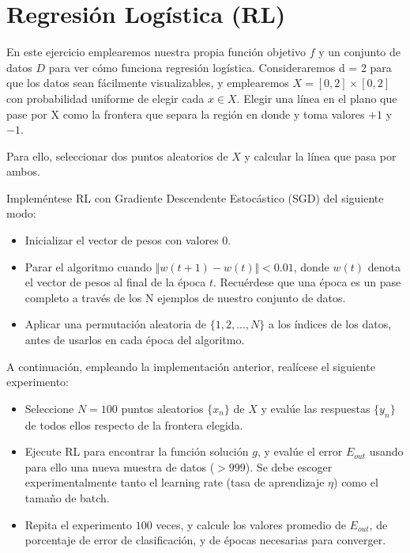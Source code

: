 \section{Regresión Logística (RL)}

En este ejercicio emplearemos nuestra propia función objetivo $f$ y un conjunto
de datos $D$ para ver cómo funciona regresión logística. Consideraremos d = 2
para que los datos sean fácilmente visualizables, y emplearemos 
$X = [0, 2] \times [0, 2]$ con probabilidad uniforme de elegir cada $x \in X$.
Elegir una línea en el plano que pase por X como la frontera que separa la
región en donde y toma valores $+1$ y $-1$.

Para ello, seleccionar dos puntos aleatorios de $X$ y calcular la línea que pasa
por ambos.

Impleméntese RL con Gradiente Descendente Estocástico (SGD) del siguiente modo:

\begin{itemize}
\item Inicializar el vector de pesos con valores 0.
\item Parar el algoritmo cuando $\Vert w(t+1) - w(t) \Vert < 0.01$, donde $w(t)$
denota el vector de pesos al final de la época $t$. Recuérdese que una época es
un pase completo a través de los N ejemplos de nuestro conjunto de datos. 
\item Aplicar una permutación aleatoria de $\{1, 2,..., N\}$ a los índices de
los datos, antes de usarlos en cada época del algoritmo. 
\end{itemize}

A continuación, empleando la implementación anterior, realícese el siguiente
experimento: 

\begin{itemize}
\item Seleccione $N = 100$ puntos aleatorios $\{x_n \}$  de $X$ y evalúe las
respuestas $\{y_n \}$ de todos ellos respecto de la frontera elegida.
\item Ejecute RL para encontrar la función solución $g$, y evalúe el error 
$E_{out}$ usando para ello una nueva muestra de datos ($> 999$). Se debe
escoger experimentalmente tanto el learning rate (tasa de aprendizaje $\eta$)
como el tamaño de batch. 
\item Repita el experimento $100$ veces, y calcule los valores promedio de 
$E_{out}$, de porcentaje de error de clasificación, y de épocas necesarias para
converger.
\end{itemize}